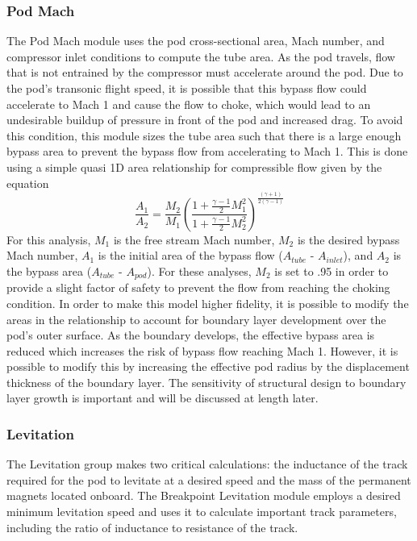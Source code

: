 \subsubsection{Pod Mach}
	The Pod Mach module uses the pod cross-sectional area, Mach number, and
	compressor inlet conditions to compute the tube area. As the pod travels,
	flow that is not entrained by the compressor must accelerate around the pod.
	Due to the pod’s transonic flight speed, it is possible that this bypass
	flow could accelerate to Mach 1 and cause the flow to choke, which would
	lead to an undesirable buildup of pressure in front of the pod and
	increased drag. To avoid this condition, this module sizes the tube area
	such that there is a large enough bypass area to prevent the bypass flow
	from accelerating to Mach 1. This is done using a simple quasi 1D area
	relationship for compressible flow given by the equation
	\begin{equation}
		\label{eq:mach_to_area}
		\frac{A_{1}}{A_{2}}=\frac{M_{2}}{M_{1}} \left( \frac{1+\frac{\gamma -1}{2}M_{1}^{2}}{1+\frac{\gamma -1}{2}M_{2}^{2}} \right)^{\frac{( \gamma +1 )}{2 ( \gamma -1  )}}
	\end{equation}
	For this analysis, $M_1$ is the free stream Mach number, $M_2$ is the
	desired bypass Mach number, $A_1$ is the initial area of the bypass flow
	($A_{tube}$ - $A_{inlet}$), and $A_2$ is the bypass area ($A_{tube}$ - $A_{pod}$).
	For these analyses, $M_2$ is set to .95 in order to provide a slight factor
	of safety to prevent the flow from reaching the choking condition.
	In order to make this model higher fidelity, it is possible to modify the
	areas in the relationship to account for boundary layer development over
	the pod's outer surface. As the boundary develops, the effective bypass area
	is reduced which increases the risk of bypass flow reaching Mach 1. However,
	it is possible to modify this by increasing the effective pod radius by the
	displacement thickness of the boundary layer. The sensitivity of structural
	design to boundary layer growth is important and will be discussed at length later.
\subsubsection{Levitation}

  The Levitation group makes two critical calculations: the inductance of the
  track required for the pod to levitate at a desired speed and the mass of
  the permanent magnets located onboard. The Breakpoint Levitation module employs a
  desired minimum levitation speed and uses it to calculate important track
  parameters, including the ratio of inductance to resistance of the track.

